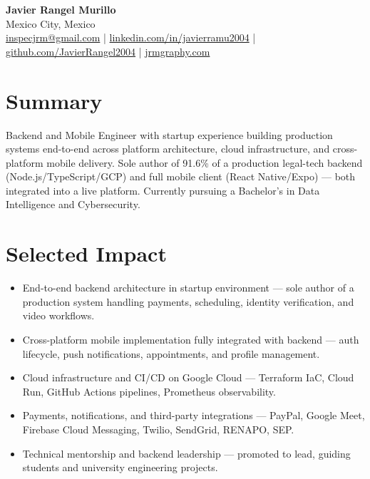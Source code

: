 \documentclass[11pt, letterpaper]{article}
\newenvironment{cvlist}{%
  \begin{itemize}[leftmargin=1.4em,itemsep=1.5pt,topsep=3pt,parsep=0pt]
}{\end{itemize}}
\begin{document}
\pagestyle{empty}

\begin{center}
  {\Huge\bfseries Javier Rangel Murillo}\\[4pt]
  Mexico City, Mexico\\[2pt]
  \href{mailto:inspecjrm@gmail.com}{inspecjrm@gmail.com}
  \enspace|\enspace
  \href{https://linkedin.com/in/javierramu2004}{linkedin.com/in/javierramu2004}
  \enspace|\enspace
  \href{https://github.com/JavierRangel2004}{github.com/JavierRangel2004}
  \enspace|\enspace
  \href{https://jrmgraphy.com}{jrmgraphy.com}
\end{center}

\section{Summary}

Backend and Mobile Engineer with startup experience building production systems
end-to-end across platform architecture, cloud infrastructure, and cross-platform
mobile delivery.
Sole author of 91.6\% of a production legal-tech backend (Node.js/TypeScript/GCP)
and full mobile client (React Native/Expo) — both integrated into a live platform.
Currently pursuing a Bachelor's in Data Intelligence and Cybersecurity.

\section{Selected Impact}

\begin{cvlist}
  \item End-to-end backend architecture in startup environment — sole author of
        a production system handling payments, scheduling, identity verification,
        and video workflows.
  \item Cross-platform mobile implementation fully integrated with backend —
        auth lifecycle, push notifications, appointments, and profile management.
  \item Cloud infrastructure and CI/CD on Google Cloud — Terraform IaC, Cloud Run,
        GitHub Actions pipelines, Prometheus observability.
  \item Payments, notifications, and third-party integrations — PayPal, Google Meet,
        Firebase Cloud Messaging, Twilio, SendGrid, RENAPO, SEP.
  \item Technical mentorship and backend leadership — promoted to lead, guiding
        students and university engineering projects.
\end{cvlist}
\end{document}
